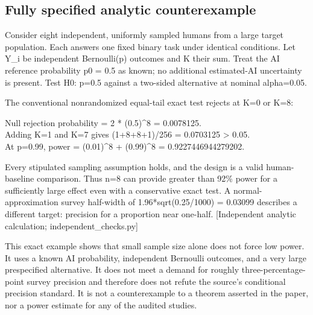 \documentclass[10pt]{article}
\begin{document}
\subsection*{Fully specified analytic counterexample}
Consider eight independent, uniformly sampled humans from a large target population. Each answers one fixed binary task under identical conditions. Let Y\_i be independent Bernoulli(p) outcomes and K their sum. Treat the AI reference probability p0 = 0.5 as known; no additional estimated-AI uncertainty is present. Test H0: p=0.5 against a two-sided alternative at nominal alpha=0.05.\par
The conventional nonrandomized equal-tail exact test rejects at K=0 or K=8:\par
{\ttfamily\footnotesize Null rejection probability = 2 * (0.5)\textasciicircum{}8 = 0.0078125.\\
Adding K=1 and K=7 gives (1+8+8+1)/256 = 0.0703125 > 0.05.\\
At p=0.99, power = (0.01)\textasciicircum{}8 + (0.99)\textasciicircum{}8 = 0.9227446944279202.}\par
Every stipulated sampling assumption holds, and the design is a valid human-baseline comparison. Thus n=8 can provide greater than 92\% power for a sufficiently large effect even with a conservative exact test. A normal-approximation survey half-width of 1.96*sqrt(0.25/1000) = 0.03099 describes a different target: precision for a proportion near one-half. [Independent analytic calculation; independent\_checks.py]\par
This exact example shows that small sample size alone does not force low power. It uses a known AI probability, independent Bernoulli outcomes, and a very large prespecified alternative. It does not meet a demand for roughly three-percentage-point survey precision and therefore does not refute the source’s conditional precision standard. It is not a counterexample to a theorem asserted in the paper, nor a power estimate for any of the audited studies.\par
\end{document}
